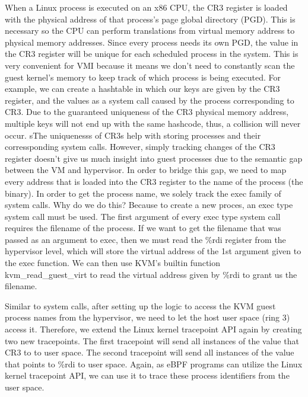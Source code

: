 \documentclass{report}
\begin{document}
\begin{spacing}{1.5}
{\large
When a Linux process is executed on an x86 CPU, the CR3 register is loaded with the physical address of that process's page global directory (PGD). This is necessary so the CPU can perform translations from virtual memory address to physical memory addresses. Since every process needs its own PGD, the value in the CR3 register will be unique for each scheduled process in the system. This is very convenient for VMI because it means we don't need to constantly scan the guest kernel's memory to keep track of which process is being executed. For example, we can create a hashtable in which our keys are given by the CR3 register, and the values as a system call caused by the process corresponding to CR3. Due to the guaranteed uniqueness of the CR3 physical memory address, multiple keys will not end up with the same hashcode, thus, a collision will never occur. sThe uniquenesss of CR3s help with storing processes and their corressponding system calls. However, simply tracking changes of the CR3 register doesn't give us much insight into guest processes due to the semantic gap between the VM and hypervisor. In order to bridge this gap, we need to map every address that is loaded into the CR3 register to the name of the process (the binary). In order to get the process name, we solely track the exec family of system calls. Why do we do this? Because to create a new proces, an exec type system call must be used. The first argument of every exec type system call requires the filename of the process. If we want to get the filename that was passed as an argument to exec, then we must read the \%rdi register from the hypervisor level, which will store the virtual address of the 1st argument given to the exec function. We can then use KVM's builtin function kvm\_read\_guest\_virt to read the virtual address given by \%rdi to grant us the filename.
\newline
}


{\large
Similar to system calls, after setting up the logic to access the KVM guest process names from the hypervisor, we need to let the host user space (ring 3) access it. Therefore, we extend the Linux kernel tracepoint API again by creating two new tracepoints. The first tracepoint will send all instances of the value that CR3 to to user space. The second tracepoint will send all instances of the value that points to \%rdi to user space. Again, as eBPF programs can utilize the Linux kernel tracepoint API, we can use it to trace these process identifiers from the user space.  
\newline
}



\end{spacing}
\end{document}
